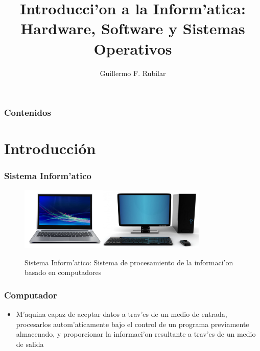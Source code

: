 \documentclass{beamer}
\begin{document}
\title[PC-OS]{Introducci'on a la Inform'atica: \\
Hardware, Software y Sistemas Operativos}
\author[G.R.]{Guillermo F. Rubilar}
\frame{\titlepage}


\begin{frame}
\frametitle{Contenidos}
\tableofcontents
\end{frame}


\section{Introducci\'on}
\begin{frame}[fragile]\frametitle{Sistema Inform'atico}
\begin{figure}
\begin{center}
\includegraphics[height=3cm]{figs/notebook.jpg}\hspace{1cm}\includegraphics[height=3cm]{figs/desktop.jpg}
\end{center}
\caption{Sistema Inform'atico: Sistema de procesamiento de la informaci'on basado en computadores}
\end{figure}
\end{frame}

\begin{frame}[fragile]\frametitle{Computador}
\begin{itemize}
\item M'aquina capaz de aceptar datos a trav'es de un medio de entrada, procesarlos autom'aticamente bajo el control de un programa previamente almacenado, y proporcionar la informaci'on resultante a trav'es de un medio de salida
\end{itemize}
\end{frame}
\end{document}
